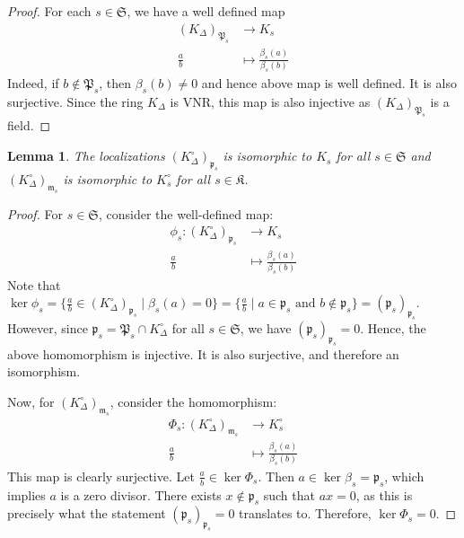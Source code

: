 \documentclass[12pts,a4paper]{amsart}
\newtheorem{lemma}[proposition]{Lemma}
\begin{document}
\begin{proof}
    For each $s\in\mathfrak{S}$, we have a well defined map
    \begin{align*}
        (K_\Delta)_{\mathfrak{P}_s}&\to K_s\\
                        \frac{a}{b}&\mapsto \frac{\beta_s(a)}{\beta_s(b)}
    \end{align*}
    Indeed, if $b\not\in\mathfrak{P}_s$, then $\beta_s(b)\neq 0$ and hence above map is well defined. It is also surjective. Since the ring $K_\Delta$ is VNR, this map is also injective as $(K_\Delta)_{\mathfrak{P}_s}$ is a field.
\end{proof}

\begin{lemma}
    The localizations $(K^\circ_\Delta)_{\mathfrak{p}_s}$ is isomorphic to $K_s$ for all $s\in\mathfrak{S}$ and $(K^\circ_\Delta)_{\mathfrak{m}_s}$ is isomorphic to $K^\circ_s$ for all $s\in\mathfrak{K}$.
\end{lemma}

\begin{proof}
   For $s\in\mathfrak{S}$, consider the well-defined map:
\begin{align*}
  \phi_s: (K^\circ_\Delta)_{\mathfrak{p}_s}&\to K_s\\
  \frac{a}{b}&\mapsto \frac{\beta_s(a)}{\beta_s(b)}
\end{align*}
Note that $\ker\phi_s=\Big\{\frac{a}{b}\in (K^\circ_\Delta)_{\mathfrak{p}_s}\mid\beta_s(a)=0\Big\}=\Big\{\frac{a}{b}\mid a\in\mathfrak{p}_s \text{ and }b\not\in\mathfrak{p}_s\Big\}=(\mathfrak{p}_s)_{\mathfrak{p}_s}$. However, since $\mathfrak{p}_s=\mathfrak{P}_s\cap K^\circ_\Delta$ for all $s\in\mathfrak{S}$, we have $(\mathfrak{p}_s)_{\mathfrak{p}_s}=0$. Hence, the above homomorphism is injective. It is also surjective, and therefore an isomorphism.

Now, for $(K^\circ_\Delta)_{\mathfrak{m}_s}$, consider the homomorphism:
\begin{align*}
  \Phi_s:(K^\circ_\Delta)_{\mathfrak{m}_s}&\to K^\circ_s\\
  \frac{a}{b}&\mapsto \frac{\beta_s(a)}{\beta_s(b)}
\end{align*}
This map is clearly surjective. Let $\frac{a}{b}\in\ker\Phi_s$. Then $a\in\ker\beta_s=\mathfrak{p}_s$, which implies $a$ is a zero divisor. There exists $x\not\in\mathfrak{p}_s$ such that $ax=0$, as this is precisely what the statement $(\mathfrak{p}_s)_{\mathfrak{p}_s}=0$ translates to. Therefore, $\ker\Phi_s=0$.
\end{proof}
\end{document}
